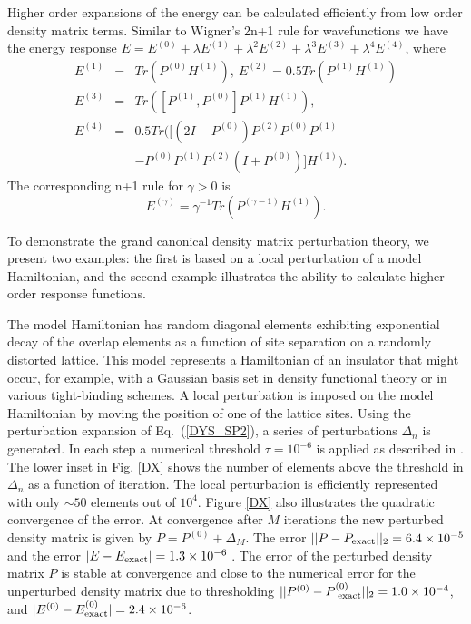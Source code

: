 \documentclass[prl,aps,twocolumn,showpacs,twocolumngrid,superbib]{revtex4}
\begin{document}
Higher order expansions of the energy can be calculated efficiently from low
order density matrix terms. Similar to Wigner's 2n+1 rule for
wavefunctions \cite{Helgaker} we have the energy response 
${E} = E^{(0)} + \lambda E^{(1)} + \lambda^2 E^{(2)} + \lambda^3 E^{(3)} 
+ \lambda^4 E^{(4)}$, where
\begin{eqnarray}\label{Tnp1}
E^{(1)} &=& Tr(P^{(0)} H^{(1)}), ~ E^{(2)} = 0.5 Tr(P^{(1)} H^{(1)}) \nonumber \\
E^{(3)} &=& Tr([P^{(1)},P^{(0)}] P^{(1)} H^{(1)}), \\
E^{(4)} &=& 0.5 Tr([(2I-P^{(0)}) P^{(2)} P^{(0)} P^{(1)} \nonumber \\
&~& - P^{(0)} P^{(1)} P^{(2)} (I+P^{(0)})] H^{(1)}). \nonumber
\end{eqnarray}
The corresponding n+1 rule for $\gamma > 0$ is 
\begin{equation}\label{Onp1}
E^{(\gamma)} = \gamma^{-1} Tr(P^{(\gamma-1)}H^{(1)}).
\end{equation}

To demonstrate the grand canonical density matrix
perturbation theory, we present two examples: the first is based  
on a local perturbation of a model Hamiltonian, and the second
example illustrates the ability to calculate higher order
response functions.

The model Hamiltonian has random
diagonal elements exhibiting exponential decay of the overlap elements 
as a function of site separation on a randomly distorted 
lattice. This model represents a Hamiltonian of an insulator
that might occur, for example, with a Gaussian basis set in 
density functional theory or in various tight-binding schemes. 
A local perturbation is imposed on the model Hamiltonian
by moving the position of one of the lattice sites.
Using the perturbation expansion of Eq.\ (\ref{DYS_SP2}),
a series of perturbations $\Delta_n$ is generated. In each 
step a numerical threshold $\tau = 10^{-6}$ is applied as described in
\cite{NiklassonSP4}.  The lower inset in Fig.  \ref{DX} shows 
the number of elements above the threshold in $\Delta_n$ 
as a function of iteration. The local perturbation
is efficiently represented with only $\sim 50$ elements out of $10^4$.
Figure \ref{DX} also illustrates the quadratic convergence
of the error.  At convergence after 
$M$ iterations the new perturbed density matrix is given by
${P} = P^{(0)} + \Delta_M$. The error 
$||{P} - P_{\rm exact}||_2 = 6.4 \times 10^{-5}$
and the error $|{E} - E_{\rm exact}| = 1.3 \times 10^{-6}$
\cite{first_order}.  The error of the perturbed density matrix 
${P}$ is stable at convergence and close to the numerical error 
for the unperturbed density matrix due to thresholding
$||P^{(0)} - P^{(0)}_{\rm ~exact}||_2 = 1.0 \times 10^{-4}$, and
$|{E}^{(0)} - E^{(0)}_{\rm exact}| = 2.4 \times 10^{-6}$.
\end{document}
